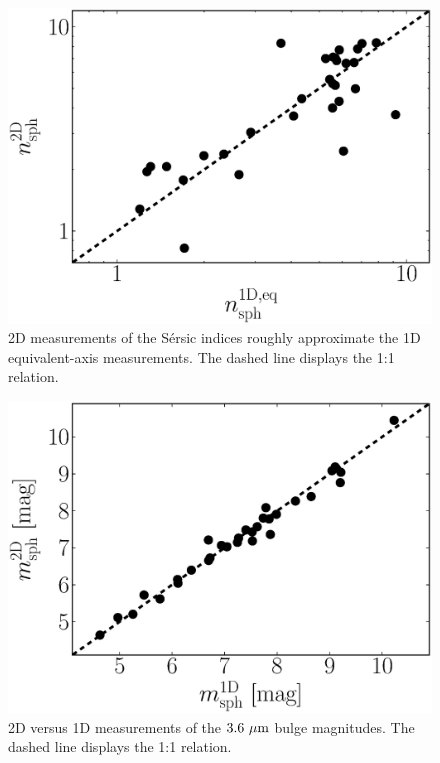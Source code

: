 \documentclass[preprint2]{emulateapj}
\begin{document}
\begin{figure}[h]
\begin{center}
\includegraphics[width=\columnwidth]{images/comparison_n.eps} 
\caption{2D measurements of the S\'ersic indices roughly approximate the 1D equivalent-axis measurements. 
The dashed line displays the 1:1 relation.}
\label{fig:n1d2d}
\end{center}
\end{figure}

\begin{figure}[h]
\begin{center}
\includegraphics[width=\columnwidth]{images/comparison_mag.eps} 
\caption{2D versus 1D measurements of the $3.6~\rm \mu m$ bulge magnitudes. The dashed line displays the 1:1 relation.}
\label{fig:mag1d2d}
\end{center}
\end{figure}
\end{document}
